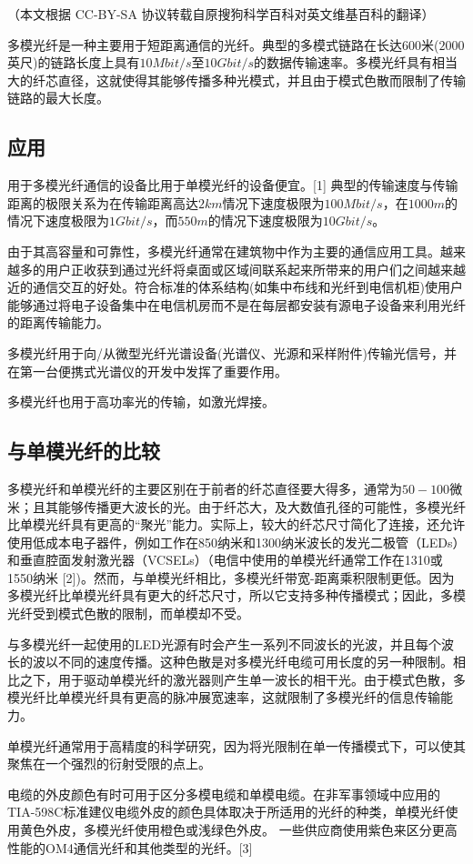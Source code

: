 （本文根据 CC-BY-SA 协议转载自原搜狗科学百科对英文维基百科的翻译）

多模光纤是一种主要用于短距离通信的光纤。典型的多模式链路在长达$600$米($2000$英尺)的链路长度上具有$10 Mbit/s$至$10 Gbit/s$的数据传输速率。多模光纤具有相当大的纤芯直径，这就使得其能够传播多种光模式，并且由于模式色散而限制了传输链路的最大长度。

\subsection{应用}
用于多模光纤通信的设备比用于单模光纤的设备便宜。[1] 典型的传输速度与传输距离的极限关系为在传输距离高达$2km$情况下速度极限为$100 Mbit/s$，在$1000m$的情况下速度极限为$1 Gbit/s$，而$550m$的情况下速度极限为$10 Gbit/s$。

由于其高容量和可靠性，多模光纤通常在建筑物中作为主要的通信应用工具。越来越多的用户正收获到通过光纤将桌面或区域间联系起来所带来的用户们之间越来越近的通信交互的好处。符合标准的体系结构(如集中布线和光纤到电信机柜)使用户能够通过将电子设备集中在电信机房而不是在每层都安装有源电子设备来利用光纤的距离传输能力。

多模光纤用于向/从微型光纤光谱设备(光谱仪、光源和采样附件)传输光信号，并在第一台便携式光谱仪的开发中发挥了重要作用。

多模光纤也用于高功率光的传输，如激光焊接。
\subsection{与单模光纤的比较}
多模光纤和单模光纤的主要区别在于前者的纤芯直径要大得多，通常为$50-100$微米；且其能够传播更大波长的光。由于纤芯大，及大数值孔径的可能性，多模光纤比单模光纤具有更高的“聚光”能力。实际上，较大的纤芯尺寸简化了连接，还允许使用低成本电子器件，例如工作在850纳米和1300纳米波长的发光二极管（LEDs）和垂直腔面发射激光器（VCSELs）（电信中使用的单模光纤通常工作在1310或1550纳米 [2])。然而，与单模光纤相比，多模光纤带宽-距离乘积限制更低。因为多模光纤比单模光纤具有更大的纤芯尺寸，所以它支持多种传播模式；因此，多模光纤受到模式色散的限制，而单模却不受。

与多模光纤一起使用的LED光源有时会产生一系列不同波长的光波，并且每个波长的波以不同的速度传播。这种色散是对多模光纤电缆可用长度的另一种限制。相比之下，用于驱动单模光纤的激光器则产生单一波长的相干光。由于模式色散，多模光纤比单模光纤具有更高的脉冲展宽速率，这就限制了多模光纤的信息传输能力。

单模光纤通常用于高精度的科学研究，因为将光限制在单一传播模式下，可以使其聚焦在一个强烈的衍射受限的点上。

电缆的外皮颜色有时可用于区分多模电缆和单模电缆。在非军事领域中应用的TIA-598C标准建仪电缆外皮的颜色具体取决于所适用的光纤的种类，单模光纤使用黄色外皮，多模光纤使用橙色或浅绿色外皮。 一些供应商使用紫色来区分更高性能的OM4通信光纤和其他类型的光纤。[3]

